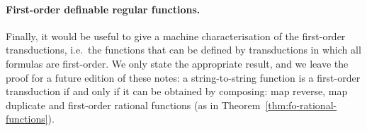         

\paragraph*{First-order definable regular functions.} Finally, it would be useful to give a machine characterisation of the first-order transductions, i.e.~the functions that can be defined by \mso transductions in which all formulas are first-order. We only state the appropriate result, and we leave the proof for a future edition of these notes: 
     a string-to-string function is a first-order transduction if and only if it can be obtained by composing: map reverse, map duplicate and first-order rational functions (as in Theorem~\ref{thm:fo-rational-functions}).


\exerciseheader

